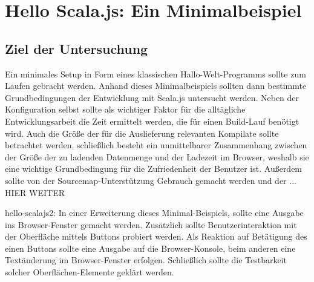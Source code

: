 \documentclass[a4paper, 12pt, hidelinks, listof=totoc, listoftables=totoc, bibliography=totoc]{scrreprt}
\begin{document}
\section{Hello Scala.js: Ein Minimalbeispiel}


%
%
%
%

\subsection{Ziel der Untersuchung}

Ein minimales Setup in Form eines klassischen Hallo-Welt-Programms sollte zum Laufen gebracht werden. Anhand dieses Minimalbeispiels sollten dann bestimmte Grundbedingungen der Entwicklung mit Scala.js untersucht werden. Neben der Konfiguration selbst sollte als wichtiger Faktor für die alltägliche Entwicklungsarbeit die Zeit ermittelt werden, die für einen Build-Lauf benötigt wird. Auch die Größe der für die Auslieferung relevanten Kompilate sollte betrachtet werden, schließlich besteht ein unmittelbarer Zusammenhang zwischen der Größe der zu ladenden Datenmenge und der Ladezeit im Browser, weshalb sie eine wichtige Grundbedingung für die Zufriedenheit der Benutzer ist.
Außerdem sollte von der Sourcemap-Unterstützung Gebrauch gemacht werden und der ... HIER WEITER

hello-scalajs2:
In einer Erweiterung dieses Minimal-Beispiels, sollte eine Ausgabe ins Browser-Fenster gemacht werden. Zusätzlich sollte Benutzerinteraktion mit der Oberfläche mittels Buttons probiert werden. Als Reaktion auf Betätigung des einen Buttons sollte eine Ausgabe auf die Browser-Konsole, beim anderen eine Textänderung im Browser-Fenster erfolgen. Schließlich sollte die Testbarkeit solcher Oberflächen-Elemente geklärt werden.
\end{document}
